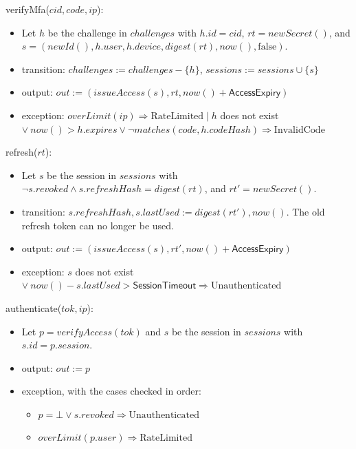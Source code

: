 \documentclass[12pt, titlepage]{article}
\begin{document}
\noindent verifyMfa($\mathit{cid}, \mathit{code}, \mathit{ip}$):
\begin{itemize}
\item Let $h$ be the challenge in $\mathit{challenges}$ with $h.\mathit{id} =
  \mathit{cid}$, $\mathit{rt} = \mathit{newSecret}()$, and $s =
  (\mathit{newId}(), h.\mathit{user}, h.\mathit{device},
  \mathit{digest}(\mathit{rt}), \mathit{now}(), \mathrm{false})$.
\item transition: $\mathit{challenges} := \mathit{challenges} - \{h\}$,
  $\mathit{sessions} := \mathit{sessions} \cup \{s\}$
\item output: $\mathit{out} := (\mathit{issueAccess}(s), \mathit{rt},
  \mathit{now}() + \textsf{AccessExpiry})$
\item exception: $\mathit{overLimit}(\mathit{ip}) \Rightarrow
  \mathrm{RateLimited} \mid h$ does not exist $\vee\ \mathit{now}() >
  h.\mathit{expires} \vee \neg \mathit{matches}(\mathit{code},
  h.\mathit{codeHash}) \Rightarrow \mathrm{InvalidCode}$
\end{itemize}

\noindent refresh($\mathit{rt}$):
\begin{itemize}
\item Let $s$ be the session in $\mathit{sessions}$ with $\neg
  s.\mathit{revoked} \wedge s.\mathit{refreshHash} =
  \mathit{digest}(\mathit{rt})$, and $\mathit{rt}' = \mathit{newSecret}()$.
\item transition: $s.\mathit{refreshHash}, s.\mathit{lastUsed} :=
  \mathit{digest}(\mathit{rt}'), \mathit{now}()$. The old refresh token can
  no longer be used.
\item output: $\mathit{out} := (\mathit{issueAccess}(s), \mathit{rt}',
  \mathit{now}() + \textsf{AccessExpiry})$
\item exception: $s$ does not exist $\vee\ \mathit{now}() -
  s.\mathit{lastUsed} > \textsf{SessionTimeout} \Rightarrow
  \mathrm{Unauthenticated}$
\end{itemize}

\noindent authenticate($\mathit{tok}, \mathit{ip}$):
\begin{itemize}
\item Let $p = \mathit{verifyAccess}(\mathit{tok})$ and $s$ be the session in
  $\mathit{sessions}$ with $s.\mathit{id} = p.\mathit{session}$.
\item output: $\mathit{out} := p$
\item exception, with the cases checked in order:
  \begin{itemize}
  \item $p = \bot \vee s.\mathit{revoked} \Rightarrow
    \mathrm{Unauthenticated}$
  \item $\mathit{overLimit}(p.\mathit{user}) \Rightarrow \mathrm{RateLimited}$
  \end{itemize}
\end{itemize}
\end{document}

